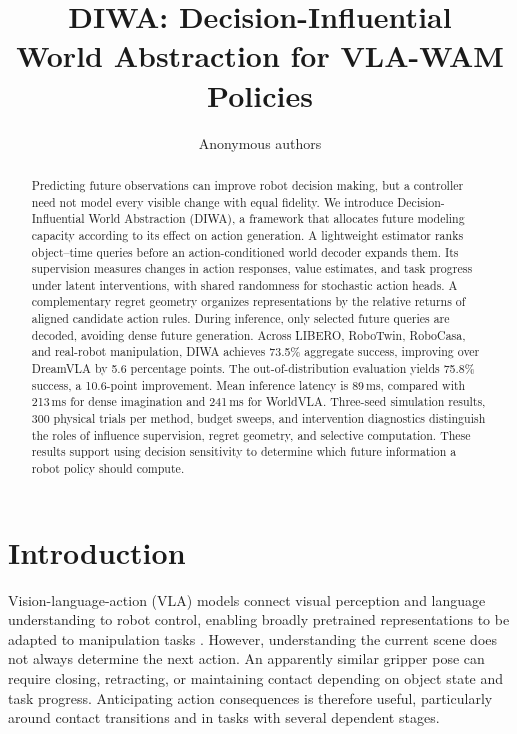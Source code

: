 \documentclass{article}
\title{DIWA: Decision-Influential\\World Abstraction for VLA-WAM Policies}
\author{Anonymous authors}
\newcommand{\method}{DIWA}
\begin{document}
\maketitle

\begin{abstract}
Predicting future observations can improve robot decision making, but a controller need not model every visible change with equal fidelity. We introduce Decision-Influential World Abstraction (\method), a framework that allocates future modeling capacity according to its effect on action generation. A lightweight estimator ranks object--time queries before an action-conditioned world decoder expands them. Its supervision measures changes in action responses, value estimates, and task progress under latent interventions, with shared randomness for stochastic action heads. A complementary regret geometry organizes representations by the relative returns of aligned candidate action rules. During inference, only selected future queries are decoded, avoiding dense future generation. Across LIBERO, RoboTwin, RoboCasa, and real-robot manipulation, \method{} achieves 73.5\% aggregate success, improving over DreamVLA by 5.6 percentage points. The out-of-distribution evaluation yields 75.8\% success, a 10.6-point improvement. Mean inference latency is 89\,ms, compared with 213\,ms for dense imagination and 241\,ms for WorldVLA. Three-seed simulation results, 300 physical trials per method, budget sweeps, and intervention diagnostics distinguish the roles of influence supervision, regret geometry, and selective computation. These results support using decision sensitivity to determine which future information a robot policy should compute.
\end{abstract}

\section{Introduction}
Vision-language-action (VLA) models connect visual perception and language understanding to robot control, enabling broadly pretrained representations to be adapted to manipulation tasks \citep{zitkovich2023rt2,kim2025openvla,ghosh2024octo}. However, understanding the current scene does not always determine the next action. An apparently similar gripper pose can require closing, retracting, or maintaining contact depending on object state and task progress. Anticipating action consequences is therefore useful, particularly around contact transitions and in tasks with several dependent stages.
\end{document}
